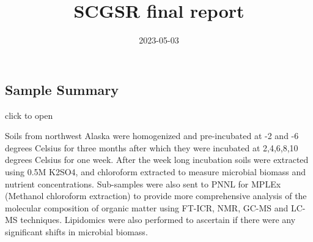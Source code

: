 \documentclass[
]{article}
\title{SCGSR final report}
\author{}
\date{\vspace{-2.5em}2023-05-03}
\begin{document}
\maketitle

\hypertarget{sample-summary}{%
\subsection{Sample Summary}\label{sample-summary}}

click to open

Soils from northwest Alaska were homogenized and pre-incubated at -2 and
-6 degrees Celsius for three months after which they were incubated at
2,4,6,8,10 degrees Celsius for one week. After the week long incubation
soils were extracted using 0.5M K2SO4, and chloroform extracted to
measure microbial biomass and nutrient concentrations. Sub-samples were
also sent to PNNL for MPLEx (Methanol chloroform extraction) to provide
more comprehensive analysis of the molecular composition of organic
matter using FT-ICR, NMR, GC-MS and LC-MS techniques. Lipidomics were
also performed to ascertain if there were any significant shifts in
microbial biomass.
\end{document}

